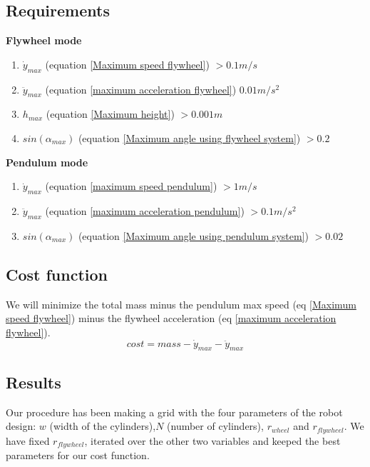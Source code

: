 \subsection{Requirements}
\textbf{Flywheel mode}
\begin{enumerate}
	\item $\dot{y}_{max}$ (equation \ref{Maximum speed flywheel}) $> 0.1m/s$
	\item $\ddot{y}_{max}$ (equation \ref{maximum acceleration flywheel}) $0.01m/s^2$
	\item $h_{max}$ (equation \ref{Maximum height}) $> 0.001m$
	\item $sin(\alpha_{max})$ (equation \ref{Maximum angle using flywheel system}) $> 0.2$
\end{enumerate}
\textbf{Pendulum mode}
\begin{enumerate}
	\item $\dot{y}_{max}$ (equation \ref{maximum speed pendulum}) $> 1m/s$
	\item $\ddot{y}_{max}$ (equation \ref{maximum acceleration pendulum}) $>0.1m/s^2$
	\item $sin(\alpha_{max})$ (equation \ref{Maximum angle using pendulum system}) $> 0.02$
\end{enumerate}
	


\subsection{Cost function}
We will minimize the total mass minus the pendulum max speed (eq \ref{Maximum speed flywheel})
minus the flywheel acceleration (eq \ref{maximum acceleration flywheel}).
\begin{equation}
	cost = mass - \dot{y}_{max} -\ddot{y}_{max}
	\label{eq: cost}
\end{equation}
\subsection{Results}
Our procedure has been making a grid with the four parameters of the robot 
design: $w$ (width of the cylinders),$N$ (number of cylinders), $r_{wheel}$ and $r_{flywheel}$.
We have fixed $r_{flywheel}$, iterated over the other two variables and keeped the best parameters for our cost function.


